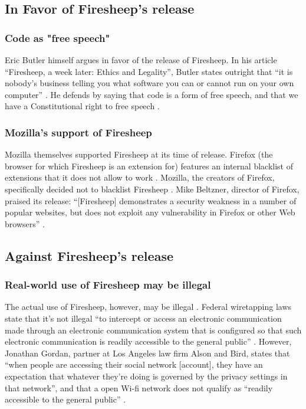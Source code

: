 \documentclass[11pt]{article}
\begin{document}
\begin{multicols}{2}
\subsection{In Favor of Firesheep's release}
\subsubsection{Code as "free speech"}
Eric Butler himself argues in favor of the release of Firesheep. In his article ``Firesheep, a week later: Ethics and Legality'', Butler states outright that ``it is nobody's business telling you what software you can or cannot run on your own computer'' \cite{butler-week-later}. He defends by saying that code is a form of free speech, and that we have a Constitutional right to free speech \cite{butler-week-later}.

\subsubsection{Mozilla's support of Firesheep}
Mozilla themselves supported Firesheep at its time of release. Firefox (the browser for which Firesheep is an extension for) features an internal blacklist of extensions that it does not allow to work \cite{mozilla-blocklist}. Mozilla, the creators of Firefox, specifically decided not to blacklist Firesheep \cite{no-kill-switch}. Mike Beltzner, director of Firefox, praised its release: ``[Firesheep] demonstrates a security weakness in a number of popular websites, but does not exploit any vulnerability in Firefox or other Web browsers'' \cite{no-kill-switch}.


\subsection{Against Firesheep's release}
\subsubsection{Real-world use of Firesheep may be illegal}
The actual use of Firesheep, however, may be illegal \cite{illegal-to-use-firesheep}. Federal wiretapping laws state that it's not illegal ``to intercept or access an electronic communication made through an electronic communication system that is configured so that such electronic communication is readily accessible to the general public'' \cite{illegal-to-use-firesheep}. However, Jonathan Gordan, partner at Los Angeles law firm Alson and Bird, states that ``when people are accessing their social network [account], they have an expectation that whatever they're doing is governed by the privacy settings in that network'', and that a open Wi-fi network does not qualify as ``readily accessible to the general public'' \cite{illegal-to-use-firesheep}.


\end{multicols}
\end{document}
